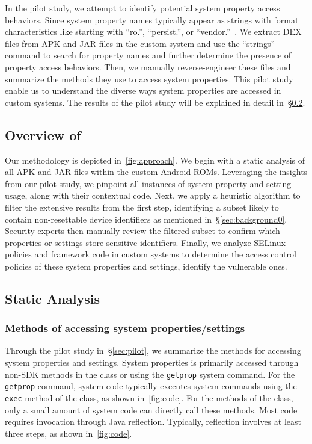 In the pilot study, we attempt to identify potential system property access behaviors.
Since system property names typically appear as strings with format characteristics like starting with ``ro.'', ``persist.'', or ``vendor.''~\cite{meng2023post}.
We extract DEX files from APK and JAR files in the custom system and use the ``strings'' command to search for property names and further determine the presence of property access behaviors. 
Then, we manually reverse-engineer these files and summarize the methods they use to access system properties.
This pilot study enable us to understand the diverse ways system properties are accessed in custom systems.
The results of the pilot study will be explained in detail in~\S\ref{sec:approachstatic}.

\subsection{Overview of {\framework}}
Our methodology is depicted in~\autoref{fig:approach}.
We begin with a static analysis of all APK and JAR files within the custom Android ROMs.
Leveraging the insights from our pilot study, we pinpoint all instances of system property and setting usage, along with their contextual code.
Next, we apply a heuristic algorithm to filter the extensive results from the first step, identifying a subset likely to contain non-resettable device identifiers as mentioned in~\S\ref{sec:background0}.
Security experts then manually review the filtered subset to confirm which properties or settings store sensitive identifiers.
Finally, we analyze SELinux policies and framework code in custom systems to determine the access control policies of these system properties and settings, identify the vulnerable ones.


\subsection{Static Analysis}
\label{sec:approachstatic}



\subsubsection{Methods of accessing system properties/settings}
Through the pilot study in~\S\ref{sec:pilot}, we summarize the methods for accessing system properties and settings.
System properties is primarily accessed through non-SDK methods in the \texttt{} class or using the \texttt{getprop} system command.
For the \texttt{getprop} command, system code typically executes system commands using the \texttt{exec} method of the \texttt{} class, as shown in~\autoref{fig:code}.
For the methods of the \texttt{} class, only a small amount of system code can directly call these methods.
Most code requires invocation through Java reflection. 
Typically, reflection involves at least three steps, as shown in~\autoref{fig:code}.

